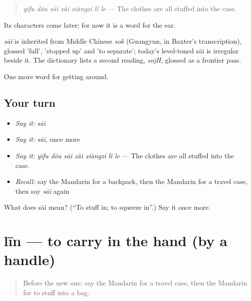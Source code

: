 \begin{quote}
\emph{yīfu dōu sāi zài xiāngzi lǐ le} — The clothes are all stuffed into the case.
\end{quote}

Its characters come later; for now it is a word for the ear.

\begin{cousinweb}
\emph{sāi} is inherited from Middle Chinese \emph{sok} (Guangyun, in Baxter's transcription), glossed 'full', 'stopped up' and 'to separate'; today's level-toned sāi is irregular beside it. The dictionary lists a second reading, \emph{sojH}, glossed as a frontier pass.
\end{cousinweb}

\begin{grammarlens}[title={What you've built}]
One more word for getting around.
\end{grammarlens}

\subsection*{Your turn}
\begin{itemize}
\raggedright
  \item \emph{Say it:} \emph{sāi}
  \item \emph{Say it:} \emph{sāi}, once more
  \item \emph{Say it:} \emph{yīfu dōu sāi zài xiāngzi lǐ le} — The clothes are all stuffed into the case.
  \item \emph{Recall:} say the Mandarin for a backpack, then the Mandarin for a travel case, then say \emph{sāi} again
\end{itemize}

\begin{tcolorbox}[breakable,colback=teal!4,colframe=teal!35!black,title={Before you move on}]
What does sāi mean? (\textquotedblleft{}To stuff in; to squeeze in\textquotedblright{}.) Say it once more.
\end{tcolorbox}
\section[līn]{līn — to carry in the hand (by a handle)}

\label{lesson:ZH-C453-lin}



\begin{quote}
Before the new one: say the Mandarin for a travel case, then the Mandarin for to stuff into a bag.
\end{quote}

